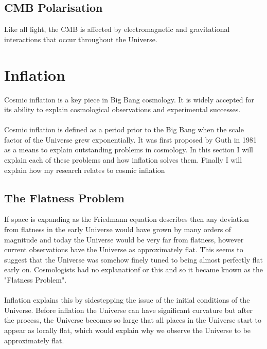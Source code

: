 \documentclass[12pt]{report}
\begin{document}
\begin{itemize}
\begin{itemize}
\subsection{CMB Polarisation}
Like all light, the CMB is affected by electromagnetic and gravitational interactions that occur throughout the Universe. 

\section{Inflation}
Cosmic inflation is a key piece in Big Bang cosmology. It is widely accepted for its ability to explain cosmological observations and experimental successes.
\\\\
Cosmic inflation is defined as a period prior to the Big Bang when the scale factor of the Universe grew exponentially. It was first proposed by Guth in 1981 as a means to explain outstanding problems in cosmology. In this section I will explain each of these problems and how inflation solves them. Finally I will explain how my research relates to cosmic inflation

\subsection{The Flatness Problem}
If space is expanding as the Friedmann equation describes then any deviation from flatness in the early Universe would have grown by many orders of magnitude and today the Universe would be very far from flatness, however current observations have the Universe as approximately flat. This seems to suggest that the Universe was somehow finely tuned to being almost perfectly flat early on. Cosmologists had no explanationf or this and so it became known as the "Flatness Problem".
\\\\
Inflation explains this by sidestepping the issue of the initial conditions of the Universe. Before inflation the Universe can have significant curvature but after the process, the Universe becomes so large that all places in the Universe start to appear as locally flat, which would explain why we observe the Universe to be approximately flat.


\end{itemize}
\end{itemize}
\end{document}
